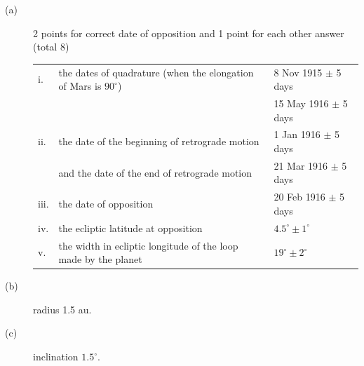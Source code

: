 \begin{description}
\item[(a)] 2 points for correct date of opposition and 1 point for each other answer
(total 8)
\begin{center}
\begin{tabular}{|ll|l|}
\hline
i. & the dates of quadrature (when the elongation of Mars is $90^\circ$)
  & 8 Nov 1915 $\pm$ 5 days\\
 & & 15 May 1916 $\pm$ 5 days\\
\hline
ii. & the date of the beginning of retrograde motion & 1 Jan 1916 $\pm$ 5 days\\
 & and the date of the end of retrograde motion & 21 Mar 1916 $\pm$ 5 days\\
\hline
iii. & the date of opposition & 20 Feb 1916 $\pm$ 5 days\\
\hline
iv. & the ecliptic latitude at opposition & $4.5^\circ \pm 1^\circ$\\
\hline
v. & the width in ecliptic longitude of the loop made by the planet
  & $19^\circ \pm 2^\circ$\\
\hline
\end{tabular}
\end{center}

\item[(b)] radius 1.5 au.

\item[(c)] inclination $1.5^\circ$.
\end{description}

